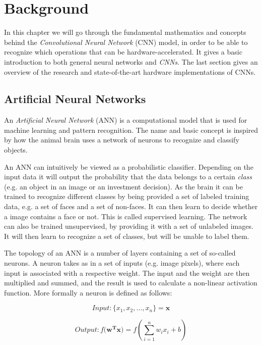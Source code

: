 \chapter{Background}

In this chapter we will go through the fundamental mathematics and concepts behind the \textit{Convolutional Neural Network} (CNN) model, in order to be able to recognize which operations that can be hardware-accelerated. It gives a basic introduction to both general neural networks and \textit{CNNs}. The last section gives an overview of the research and state-of-the-art hardware implementations of CNNs. 

\section{Artificial Neural Networks}\label{ann}

An \textit{Artificial Neural Network} (ANN) is a computational model that is used for machine learning and pattern recognition. The name and basic concept is inspired by how the animal brain uses a network of neurons to recognize and classify objects. 

An ANN can intuitively be viewed as a probabilistic classifier. Depending on the input data it will output the probability that the data belongs to a certain \textit{class} (e.g. an object in an image or an investment decision). As the brain it can be trained to recognize different classes by being provided a set of labeled training data, e.g. a set of faces and a set of non-faces. It can then learn to decide whether a image contains a face or not. This is called supervised learning. The network can also be trained unsupervised, by providing it with a set of unlabeled images. It will then learn to recognize a set of classes, but will be unable to label them.  

The topology of an ANN is a number of layers containing a set of so-called neurons. A neuron takes as in a set of inputs (e.g. image pixels), where each input is associated with a respective weight. The input and the weight are then multiplied and summed, and the result is used to calculate a non-linear activation function. More formally a neuron is defined as follows: 

\begin{equation*}
Input: \{x_1, x_2,\dots, x_n\} = \mathbf{x} 
\end{equation*}

\begin{equation*}
Output: f(\mathbf{w^{T}x)} = f(\sum_{i=1}^{n}w_i x_i + b)
\end{equation*}

